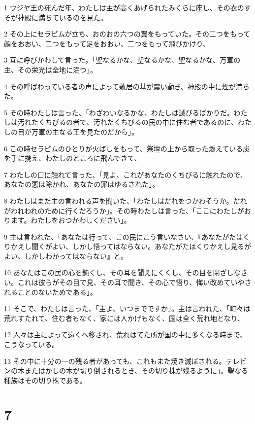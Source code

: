 \par 1 ウジヤ王の死んだ年、わたしは主が高くあげられたみくらに座し、その衣のすそが神殿に満ちているのを見た。
\par 2 その上にセラピムが立ち、おのおの六つの翼をもっていた。その二つをもって顔をおおい、二つをもって足をおおい、二つをもって飛びかけり、
\par 3 互に呼びかわして言った。「聖なるかな、聖なるかな、聖なるかな、万軍の主、その栄光は全地に満つ」。
\par 4 その呼ばわっている者の声によって敷居の基が震い動き、神殿の中に煙が満ちた。
\par 5 その時わたしは言った、「わざわいなるかな、わたしは滅びるばかりだ。わたしは汚れたくちびるの者で、汚れたくちびるの民の中に住む者であるのに、わたしの目が万軍の主なる王を見たのだから」。
\par 6 この時セラピムのひとりが火ばしをもって、祭壇の上から取った燃えている炭を手に携え、わたしのところに飛んできて、
\par 7 わたしの口に触れて言った、「見よ、これがあなたのくちびるに触れたので、あなたの悪は除かれ、あなたの罪はゆるされた」。
\par 8 わたしはまた主の言われる声を聞いた、「わたしはだれをつかわそうか。だれがわれわれのために行くだろうか」。その時わたしは言った、「ここにわたしがおります。わたしをおつかわしください」。
\par 9 主は言われた、「あなたは行って、この民にこう言いなさい、『あなたがたはくりかえし聞くがよい、しかし悟ってはならない。あなたがたはくりかえし見るがよい、しかしわかってはならない』と。
\par 10 あなたはこの民の心を鈍くし、その耳を聞えにくくし、その目を閉ざしなさい。これは彼らがその目で見、その耳で聞き、その心で悟り、悔い改めていやされることのないためである」。
\par 11 そこで、わたしは言った、「主よ、いつまでですか」。主は言われた、「町々は荒れすたれて、住む者もなく、家には人かげもなく、国は全く荒れ地となり、
\par 12 人々は主によって遠くへ移され、荒れはてた所が国の中に多くなる時まで、こうなっている。
\par 13 その中に十分の一の残る者があっても、これもまた焼き滅ぼされる。テレビンの木またはかしの木が切り倒されるとき、その切り株が残るように」。聖なる種族はその切り株である。

\chapter{7}

